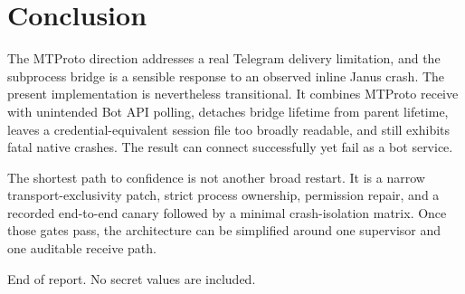 \documentclass[10pt]{article}
\begin{document}
\section{Conclusion}

The MTProto direction addresses a real Telegram delivery limitation, and the subprocess bridge is a sensible response to an observed inline Janus crash. The present implementation is nevertheless transitional. It combines MTProto receive with unintended Bot API polling, detaches bridge lifetime from parent lifetime, leaves a credential-equivalent session file too broadly readable, and still exhibits fatal native crashes. The result can connect successfully yet fail as a bot service.

The shortest path to confidence is not another broad restart. It is a narrow transport-exclusivity patch, strict process ownership, permission repair, and a recorded end-to-end canary followed by a minimal crash-isolation matrix. Once those gates pass, the architecture can be simplified around one supervisor and one auditable receive path.

\vfill
\begin{center}
\small End of report. No secret values are included.
\end{center}
\end{document}
